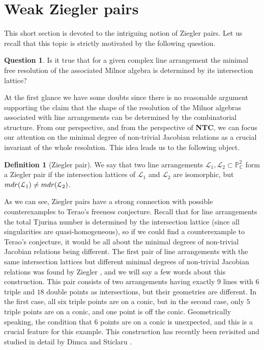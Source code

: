 \documentclass[12pt]{article}
\theoremstyle{plain}
\theoremstyle{definition}
\newtheorem{definition}[thm]{Definition}
\newtheorem{question}[thm]{Question}
\begin{document}
\section{Weak Ziegler pairs}
This short section is devoted to the intriguing notion of Ziegler pairs. Let us recall that this topic is strictly motivated by the following question.
\begin{question}
Is it true that for a given complex line arrangement the minimal free resolution of the associated Milnor algebra is determined by its intersection lattice?
\end{question}
At the first glance we have some doubts since there is no reasonable argument supporting the claim that the shape of the resolution of the Milnor algebras associated with line arrangements can be determined by the combinatorial structure. From our perspective, and from the perspective of \textbf{NTC}, we can focus our attention on the minimal degree of non-trivial Jacobian relations as a crucial invariant of the whole resolution. This idea leads us to the following object.
\begin{definition}[Ziegler pair]
We say that two line arrangements $\mathcal{L}_{1}, \mathcal{L}_{2} \subset \mathbb{P}^{2}_{\mathbb{C}}$ form a Ziegler pair if the intersection lattices of $\mathcal{L}_{1}$ and $\mathcal{L}_{2}$ are isomorphic, but ${\rm mdr}(\mathcal{L}_{1}) \neq {\rm mdr}(\mathcal{L}_{2})$.
\end{definition}
As we can see, Ziegler pairs have a strong connection with possible counterexamples to Terao's freeness conjecture. Recall that for line arrangements the total Tjurina number is determined by the intersection lattice (since all singularities are quasi-homogeneous), so if we could find a counterexample to Terao's conjecture, it would be all about the minimal degrees of non-trivial Jacobian relations being different.
The first pair of line arrangements with the same intersection lattices but different minimal degrees of non-trivial Jacobian relations was found by Ziegler \cite{Ziegler}, and we will say a few words about this construction. This pair consists of two arrangements having exactly $9$ lines with $6$ triple and $18$ double points as intersections, but their geometries are different. In the first case, all six triple points are on a conic, but in the second case, only $5$ triple points are on a conic, and one point is off the conic. Geometrically speaking, the condition that $6$ points are on a conic is unexpected, and this is a crucial feature for this example. This construction has recently been revisited and studied in detail by Dimca and Sticlaru \cite{DimSt}.
\end{document}
